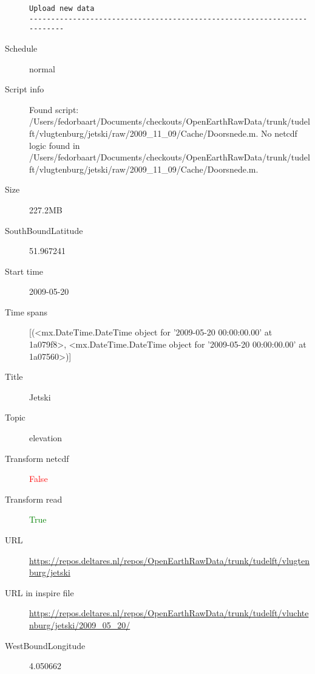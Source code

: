 \documentclass[9]{report}
\begin{document}
\begin{description}
\begin{verbatim}
Upload new data
------------------------------------------------------------------------

\end{verbatim}
  \item[Schedule] normal
  \item[Script info] Found script: /Users/fedorbaart/Documents/checkouts/OpenEarthRawData/trunk/tudelft/vlugtenburg/jetski/raw/2009\_11\_09/Cache/Doorsnede.m.
No netcdf logic found in /Users/fedorbaart/Documents/checkouts/OpenEarthRawData/trunk/tudelft/vlugtenburg/jetski/raw/2009\_11\_09/Cache/Doorsnede.m.
  \item[Size] 227.2MB
  \item[SouthBoundLatitude] 51.967241
  \item[Start time] 2009-05-20
  \item[Time spans] [(<mx.DateTime.DateTime object for '2009-05-20 00:00:00.00' at 1a079f8>, <mx.DateTime.DateTime object for '2009-05-20 00:00:00.00' at 1a07560>)]
  \item[Title]  Jetski 
  \item[Topic] elevation
  \item[Transform netcdf] \textcolor{red}{False}
  \item[Transform read] \textcolor{green}{True}
  \item[URL] \href{https://repos.deltares.nl/repos/OpenEarthRawData/trunk/tudelft/vlugtenburg/jetski}{https://repos.deltares.nl/repos/OpenEarthRawData/trunk/tudelft/vlugtenburg/jetski}
  \item[URL in inspire file] \href{https://repos.deltares.nl/repos/OpenEarthRawData/trunk/tudelft/vluchtenburg/jetski/2009\_05\_20/}{https://repos.deltares.nl/repos/OpenEarthRawData/trunk/tudelft/vluchtenburg/jetski/2009\_05\_20/}
  \item[WestBoundLongitude] 4.050662
\end{description}
\end{document}
